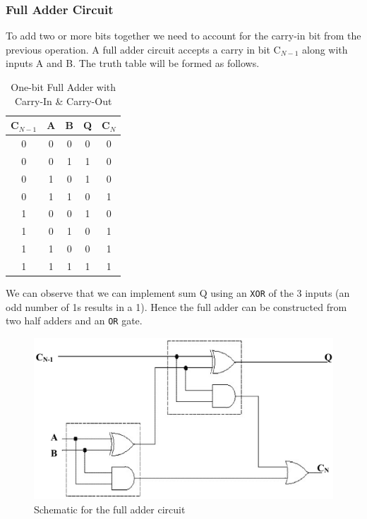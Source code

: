\subsubsection*{Full Adder Circuit}

To add two or more bits together we need to account for the carry-in bit from the previous operation. A full adder circuit accepts a carry in bit C$_{N-1}$ along with inputs A and B. The truth table will be formed as follows.

\begin{table}[H]
    \centering
    \begin{tabular}{|c|c|c|c|c|}\hline
    C$_{N-1}$ & A & B & Q & C$_N$ \\ \hline
    0 & 0 & 0 & 0 & 0 \\ 
    0 & 0 & 1 & 1 & 0 \\ 
    0 & 1 & 0 & 1 & 0 \\ 
    0 & 1 & 1 & 0 & 1 \\
    1 & 0 & 0 & 1 & 0 \\ 
    1 & 0 & 1 & 0 & 1 \\ 
    1 & 1 & 0 & 0 & 1 \\ 
    1 & 1 & 1 & 1 & 1 \\ \hline
    \end{tabular}
    \caption{One-bit Full Adder with Carry-In \& Carry-Out}
\end{table}

We can observe that we can implement sum Q using an \verb|XOR| of the 3 inputs (an odd number of 1s results in a 1). Hence the full adder can be constructed from two half adders and an \verb|OR| gate.

\begin{figure}[H]
    \centering
    \includegraphics[width=0.85\columnwidth]{images/full-adder.png}
    \caption{Schematic for the full adder circuit}
    \label{full-adder}
\end{figure}

